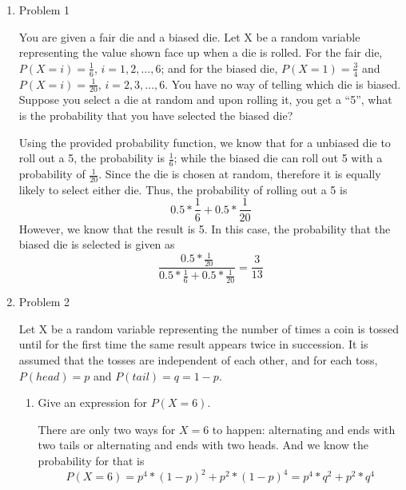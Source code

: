 \documentclass[letterpaper]{article}
\begin{document}
\begin{enumerate}
\item{Problem 1}
\begin{mdframed}
You are given a fair die and a biased die. Let X be a random variable representing the value shown face up when a die is rolled. For the fair die, $P(X = i) = \frac{1}{6}$, $i = 1, 2, \dots, 6$; and for the biased die, $P(X = 1) = \frac{3}{4}$ and $P(X = i) = \frac{1}{20}$, $i = 2, 3, \dots, 6$. You have no way of telling which die is biased. Suppose you select a die at random and upon rolling it, you get a “5”, what is the probability that you have selected the biased die?
\end{mdframed}

Using the provided probability function, we know that for a unbiased die to roll out a 5, the probability is $\frac{1}{6}$; while the biased die can roll out 5 with a probability of $\frac{1}{20}$. Since the die is chosen at random, therefore it is equally likely to select either die. Thus, the probability of rolling out a 5 is
\begin{equation}
0.5 * \frac{1}{6} + 0.5 * \frac{1}{20}
\end{equation}
However, we know that the result is 5. In this case, the probability that the biased die is selected is given as
\begin{equation}
\frac{0.5 * \frac{1}{20}}{0.5 * \frac{1}{6} + 0.5 * \frac{1}{20}} = \frac{3}{13}
\end{equation}

\medskip

\item{Problem 2}
\begin{mdframed}
Let X be a random variable representing the number of times a coin is tossed until for the first time the same result appears twice in succession. It is assumed that the tosses are independent of each other, and for each toss, $P(head) = p$ and $P(tail) = q = 1- p$.
\end{mdframed}
\begin{enumerate}
\item{} Give an expression for $P(X = 6)$. 

There are only two ways for $X=6$ to happen: alternating and ends with two tails or alternating and ends with two heads. And we know the probability for that is
\begin{equation}
P(X = 6) = p^4*(1-p)^2 + p^2*(1-p)^4 = p^4 * q^2 + p^2 * q^4
\end{equation}


\end{enumerate}
\end{enumerate}
\end{document}

